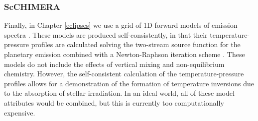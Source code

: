 
\subsubsection{ScCHIMERA}

Finally, in Chapter \ref{eclipses} we use a grid of 1D forward models of emission spectra \citep{Piskorz2018, Line2013a}. These models are produced self-consistently, in that their temperature-pressure profiles are calculated solving the two-stream source function for the planetary emission combined with a Newton-Raphson iteration scheme \citep{McKay1989}. These models do not include the effects of vertical mixing and non-equilibrium chemistry. However, the self-consistent calculation of the temperature-pressure profiles allows for a demonstration of the formation of temperature inversions due to the absorption of stellar irradiation. In an ideal world, all of these model attributes would be combined, but this is currently too computationally expensive.





